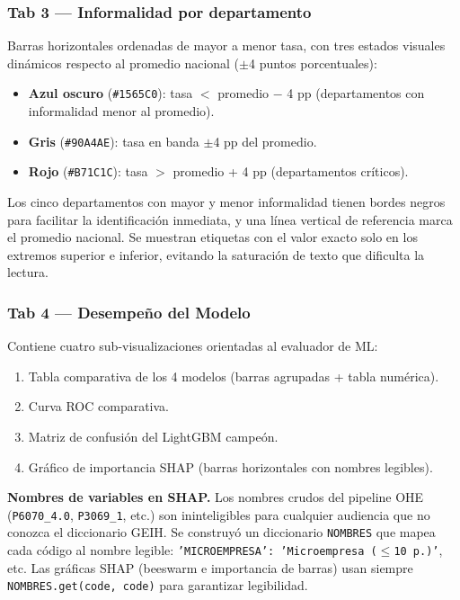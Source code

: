 \documentclass[12pt, a4paper]{article}
\begin{document}
\subsubsection{Tab 3 — Informalidad por departamento}

Barras horizontales ordenadas de mayor a menor tasa, con tres estados visuales
dinámicos respecto al promedio nacional ($\pm$4 puntos porcentuales):

\begin{itemize}[noitemsep]
  \item \textbf{Azul oscuro} (\texttt{\#1565C0}): tasa $<$ promedio $-$ 4 pp
  (departamentos con informalidad menor al promedio).
  \item \textbf{Gris} (\texttt{\#90A4AE}): tasa en banda $\pm$4 pp del promedio.
  \item \textbf{Rojo} (\texttt{\#B71C1C}): tasa $>$ promedio + 4 pp
  (departamentos críticos).
\end{itemize}

Los cinco departamentos con mayor y menor informalidad tienen bordes negros para
facilitar la identificación inmediata, y una línea vertical de referencia marca el
promedio nacional. Se muestran etiquetas con el valor exacto solo en los extremos
superior e inferior, evitando la saturación de texto que dificulta la lectura.

\subsubsection{Tab 4 — Desempeño del Modelo}

Contiene cuatro sub-visualizaciones orientadas al evaluador de ML:
\begin{enumerate}[label=\arabic*., noitemsep]
  \item Tabla comparativa de los 4 modelos (barras agrupadas + tabla numérica).
  \item Curva ROC comparativa.
  \item Matriz de confusión del LightGBM campeón.
  \item Gráfico de importancia SHAP (barras horizontales con nombres legibles).
\end{enumerate}

\begin{decision}
\textbf{Nombres de variables en SHAP.} Los nombres crudos del pipeline OHE
(\texttt{P6070\_4.0}, \texttt{P3069\_1}, etc.) son ininteligibles para cualquier
audiencia que no conozca el diccionario GEIH. Se construyó un diccionario
\texttt{NOMBRES} que mapea cada código al nombre legible:
\texttt{'MICROEMPRESA': 'Microempresa ($\leq$10 p.)'}, etc. Las gráficas SHAP
(beeswarm e importancia de barras) usan siempre \texttt{NOMBRES.get(code, code)}
para garantizar legibilidad.
\end{decision}
\end{document}
